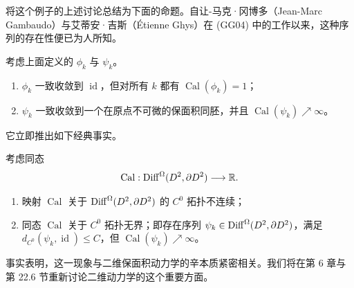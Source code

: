 将这个例子的上述讨论总结为下面的命题。自让-马克·冈博多（Jean-Marc Gambaudo）与艾蒂安·吉斯（Étienne Ghys）在 (GG04) 中的工作以来，这种序列的存在性便已为人所知。

\begin{proposition}
\label{prop:calabi-noncontinuous-sequences}
考虑上面定义的 $\phi_k$ 与 $\psi_k$。
\begin{enumerate}[label=(\arabic*)]
  \item $\phi_k$ 一致收敛到 $\operatorname{id}$，但对所有 $k$ 都有 $\operatorname{Cal}(\phi_k)=1$；
  \item $\psi_k$ 一致收敛到一个在原点不可微的保面积同胚，并且
  $\operatorname{Cal}(\psi_k)\nearrow\infty$。
\end{enumerate}
\end{proposition}

它立即推出如下经典事实。

\begin{corollary}[与 (GG04) 比较]
\label{cor:calabi-c0-discontinuous-unbounded}
考虑同态
\[
  \operatorname{Cal}:\operatorname{Diff}^\Omega(D^2,\partial D^2)\longrightarrow\mathbb R.
\]
\begin{enumerate}[label=(\arabic*)]
  \item 映射 $\operatorname{Cal}$ 关于 $\operatorname{Diff}^\Omega(D^2,\partial D^2)$ 的 $C^0$ 拓扑不连续；
  \item 同态 $\operatorname{Cal}$ 关于 $C^0$ 拓扑无界；即存在序列
  $\psi_k\in\operatorname{Diff}^\Omega(D^2,\partial D^2)$，满足
  $d_{C^0}(\psi_k,\operatorname{id})\le C$，但
  $\operatorname{Cal}(\psi_k)\nearrow\infty$。
\end{enumerate}
\end{corollary}

事实表明，这一现象与二维保面积动力学的辛本质紧密相关。我们将在第 6 章与第 22.6 节重新讨论二维动力学的这个重要方面。
